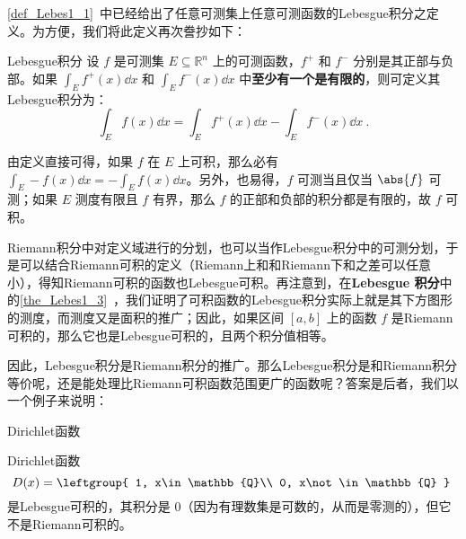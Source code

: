 

\autoref{def_Lebes1_1}~中已经给出了任意可测集上任意可测函数的Lebesgue积分之定义。为方便，我们将此定义再次誊抄如下：

\begin{definition}{Lebesgue积分}
设 $f$ 是可测集 $E\subseteq\mathbb{R}^n$ 上的可测函数，$f^+$ 和 $f^-$ 分别是其正部与负部。如果 $\int_E f^+(x) \dd x$ 和 $\int_E f^-(x) \dd x$ 中\textbf{至少有一个是有限的}，则可定义其Lebesgue积分为：
\begin{equation}
\int_E f(x) \dd x = \int_E f^+(x) \dd x - \int_E f^-(x) \dd x~.
\end{equation}
\end{definition}

由定义直接可得，如果 $f$ 在 $E$ 上可积，那么必有 $\int_E -f(x) \dd x = -\int_E f(x) \dd x$。另外，也易得，$f$ 可测当且仅当 $\abs{f}$ 可测；如果 $E$ 测度有限且 $f$ 有界，那么 $f$ 的正部和负部的积分都是有限的，故 $f$ 可积。



Riemann积分中对定义域进行的分划，也可以当作Lebesgue积分中的可测分划，于是可以结合Riemann可积的定义（Riemann上和和Riemann下和之差可以任意小），得知Riemann可积的函数也Lebesgue可积。再注意到，在\textbf{Lebesgue 积分}中的\autoref{the_Lebes1_3}~，我们证明了可积函数的Lebesgue积分实际上就是其下方图形的测度，而测度又是面积的推广；因此，如果区间 $[a, b]$ 上的函数 $f$ 是Riemann可积的，那么它也是Lebesgue可积的，且两个积分值相等。

因此，Lebesgue积分是Riemann积分的推广。那么Lebesgue积分是和Riemann积分等价呢，还是能处理比Riemann可积函数范围更广的函数呢？答案是后者，我们以一个例子来说明：

\begin{example}{Dirichlet函数}

Dirichlet函数
\begin{equation}
D(x)=
\leftgroup{
    1, x\in\mathbb{Q}\\
    0, x\not\in\mathbb{Q}
}~
\end{equation}
是Lebesgue可积的，其积分是 $0$（因为有理数集是可数的，从而是零测的），但它不是Riemann可积的。

\end{example}
















